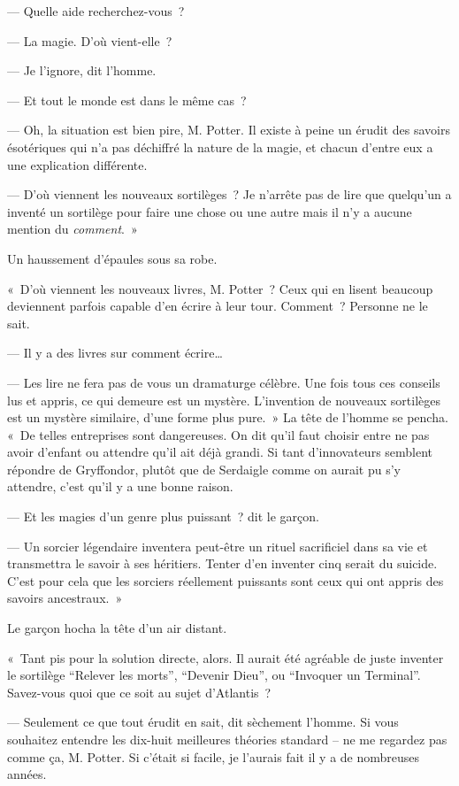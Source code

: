 --- Quelle aide recherchez-vous~?

--- La magie. D'où vient-elle~?

--- Je l'ignore, dit l'homme.

--- Et tout le monde est dans le même cas~?

--- Oh, la situation est bien pire, M. Potter. Il existe à peine un érudit des savoirs ésotériques qui n'a pas déchiffré la nature de la magie, et chacun d'entre eux a une explication différente.

--- D'où viennent les nouveaux sortilèges~? Je n'arrête pas de lire que quelqu'un a inventé un sortilège pour faire une chose ou une autre mais il n'y a aucune mention du \emph{comment}.~»

Un haussement d'épaules sous sa robe.

«~D'où viennent les nouveaux livres, M. Potter~? Ceux qui en lisent beaucoup deviennent parfois capable d'en écrire à leur tour. Comment~? Personne ne le sait.

--- Il y a des livres sur comment écrire…

--- Les lire ne fera pas de vous un dramaturge célèbre. Une fois tous ces conseils lus et appris, ce qui demeure est un mystère. L'invention de nouveaux sortilèges est un mystère similaire, d'une forme plus pure.~» La tête de l'homme se pencha. «~De telles entreprises sont dangereuses. On dit qu'il faut choisir entre ne pas avoir d'enfant ou attendre qu'il ait déjà grandi. Si tant d'innovateurs semblent répondre de Gryffondor, plutôt que de Serdaigle comme on aurait pu s'y attendre, c'est qu'il y a une bonne raison.

--- Et les magies d'un genre plus puissant~? dit le garçon.

--- Un sorcier légendaire inventera peut-être un rituel sacrificiel dans sa vie et transmettra le savoir à ses héritiers. Tenter d'en inventer cinq serait du suicide. C'est pour cela que les sorciers réellement puissants sont ceux qui ont appris des savoirs ancestraux.~»

Le garçon hocha la tête d'un air distant.

«~Tant pis pour la solution directe, alors. Il aurait été agréable de juste inventer le sortilège “Relever les morts”, “Devenir Dieu”, ou “Invoquer un Terminal”. Savez-vous quoi que ce soit au sujet d'Atlantis~?

--- Seulement ce que tout érudit en sait, dit sèchement l'homme. Si vous souhaitez entendre les dix-huit meilleures théories standard -- ne me regardez pas comme ça, M. Potter. Si c'était si facile, je l'aurais fait il y a de nombreuses années.

